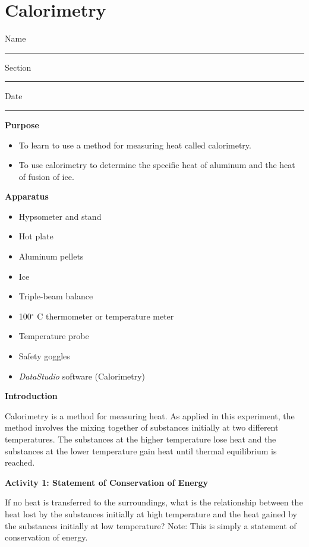 
\section{Calorimetry}

Name \rule{2.0in}{0.1pt}\hfill{}Section \rule{1.0in}{0.1pt}\hfill{}Date
\rule{1.0in}{0.1pt}

\textbf{Purpose}

\begin{itemize}
\item To learn to use a method for measuring heat called calorimetry.
\item To use calorimetry to determine the specific heat of aluminum and
the heat of fusion of ice.
\end{itemize}
\textbf{Apparatus}

\begin{itemize}
\item Hypsometer and stand 
\item Hot plate 
\item Aluminum pellets 
\item Ice 
\item Triple-beam balance 
\item 100\( ^{\circ } \) C thermometer or temperature meter
\item Temperature probe
\item Safety goggles
\item \textit{DataStudio} software (Calorimetry)
\end{itemize}
\textbf{Introduction} 

Calorimetry is a method for measuring heat. As applied in this experiment,
the method involves the mixing together of substances initially at
two different temperatures. The substances at the higher temperature
lose heat and the substances at the lower temperature gain heat until
thermal equilibrium is reached.

\textbf{Activity 1: Statement of Conservation of Energy}

If no heat is transferred to the surroundings, what is the relationship
between the heat lost by the substances initially at high temperature
and the heat gained by the substances initially at low temperature?
Note: This is simply a statement of conservation of energy.

